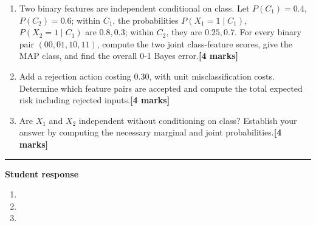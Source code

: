\documentclass[11pt,a4paper]{article}
\newlength{\BlankAnswerHeight}\setlength{\BlankAnswerHeight}{16mm}
\newcommand{\AnswerBlank}{\leavevmode\par\vspace{\BlankAnswerHeight}}
\begin{document}
\begin{enumerate}[label=(\alph*),leftmargin=8mm,itemsep=3pt]
\item Two binary features are independent conditional on class. Let \(P(C_1)=0.4\), \(P(C_2)=0.6\); within \(C_1\), the probabilities \(P(X_1=1\mid C_1)\), \(P(X_2=1\mid C_1)\) are \(0.8,0.3\); within \(C_2\), they are \(0.25,0.7\). For every binary pair \((00,01,10,11)\), compute the two joint class-feature scores, give the MAP class, and find the overall 0-1 Bayes error.\hfill\textbf{[4 marks]}
\item Add a rejection action costing \(0.30\), with unit misclassification costs. Determine which feature pairs are accepted and compute the total expected risk including rejected inputs.\hfill\textbf{[4 marks]}
\item Are \(X_1\) and \(X_2\) independent without conditioning on class? Establish your answer by computing the necessary marginal and joint probabilities.\hfill\textbf{[4 marks]}
\end{enumerate}\par\medskip\hrule\medskip\textbf{Student response}\par
\begin{enumerate}[label=(\alph*),leftmargin=8mm,itemsep=3pt]
\item
\AnswerBlank
\item
\AnswerBlank
\item
\AnswerBlank
\end{enumerate}
\end{document}
